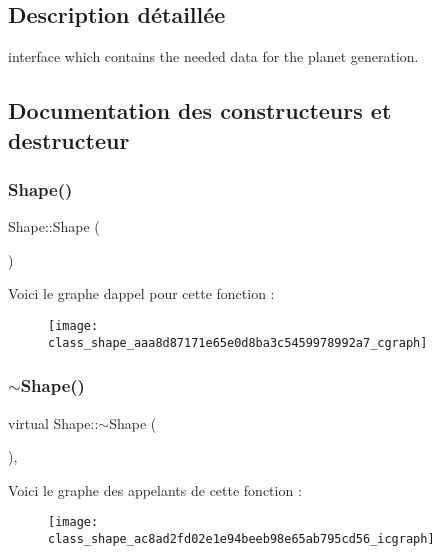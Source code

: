 \subsection{Description détaillée}
interface which contains the needed data for the planet generation. 

\subsection{Documentation des constructeurs et destructeur}
\mbox{\label{class_shape_aaa8d87171e65e0d8ba3c5459978992a7}} 
\subsubsection{\texorpdfstring{Shape()}{Shape()}}
{\footnotesize\ttfamily Shape\+::\+Shape (\begin{DoxyParamCaption}{ }\end{DoxyParamCaption})\hspace{0.3cm}{\ttfamily [inline]}}

Voici le graphe d\textquotesingle{}appel pour cette fonction \+:\nopagebreak
\begin{figure}[H]
\begin{center}
\leavevmode
\texttt{[image: class\_shape\_aaa8d87171e65e0d8ba3c5459978992a7\_cgraph]}
\end{center}
\end{figure}
\mbox{\label{class_shape_ac8ad2fd02e1e94beeb98e65ab795cd56}} 
\subsubsection{\texorpdfstring{$\sim$\+Shape()}{~Shape()}}
{\footnotesize\ttfamily virtual Shape\+::$\sim$\+Shape (\begin{DoxyParamCaption}{ }\end{DoxyParamCaption})\hspace{0.3cm}{\ttfamily [virtual]}, {\ttfamily [default]}}

Voici le graphe des appelants de cette fonction \+:\nopagebreak
\begin{figure}[H]
\begin{center}
\leavevmode
\texttt{[image: class\_shape\_ac8ad2fd02e1e94beeb98e65ab795cd56\_icgraph]}
\end{center}
\end{figure}



